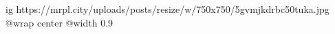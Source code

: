  
 
 
 
 

\ifcmt
  ig https://mrpl.city/uploads/posts/resize/w/750x750/5gvmjkdrbc50tuka.jpg
  @wrap center
  @width 0.9
\fi
